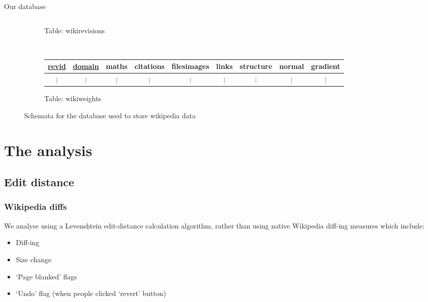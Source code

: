 \documentclass[t]{beamer}
\begin{document}
\begin{frame}[fragile]{Our database}
\begin{figure}[b]
\begin{subfigure}[b!]{\linewidth}
\begin{tabular}{ccccccccc}
    \end{tabular}
    \caption{\tiny Table: wikirevisions}
  \end{subfigure}\\
  \vspace{2mm}
  \begin{subfigure}[b!]{\linewidth}
    \centering
    \begin{tabular}{ccccccccc}
      \toprule
      \underline{revid} & \underline{domain} & maths & citations & filesimages & links &
      structure & normal & gradient\\
      \midrule
      $\vdots$ & $\vdots$ & $\vdots$ & $\vdots$ & $\vdots$ & $\vdots$ &
      $\vdots$ & $\vdots$ & $\vdots$ \\
    \end{tabular}
    \caption{\tiny Table: wikiweights} 
  \end{subfigure}
  \caption{Schemata for the database used to store wikipedia data}
\end{figure}  
\end{frame}
  
  \section{The analysis}

  \subsection{Edit distance}
  \begin{frame}
    \frametitle{Wikipedia diffs} 

    We analyse using a Levenshtein edit-distance calculation
    algorithm, rather than using native Wikipedia diff-ing measures
    which include: 
    \begin{itemize}
      \item Diff-ing
      \item Size change
      \item `Page blanked' flags
      \item `Undo' flag (when people clicked `revert' button)
    \end{itemize}

    
  \end{frame}
\end{document}
